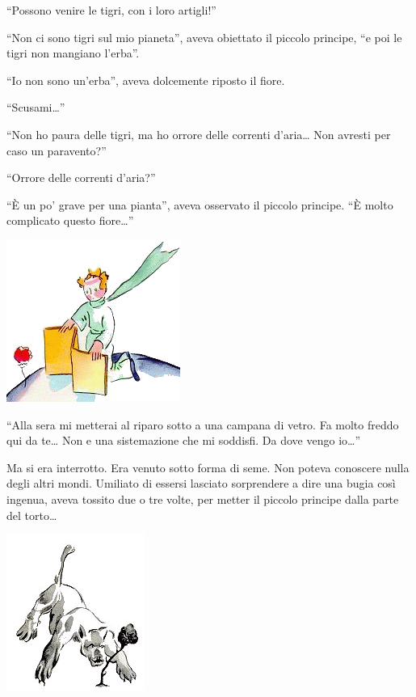 \documentclass[11pt]{scrbook}
\begin{document}
``Possono venire le tigri, con i loro artigli!''

``Non ci sono tigri sul mio pianeta'', aveva obiettato il piccolo
principe, ``e poi le tigri non mangiano l'erba''.

``Io non sono un'erba'', aveva dolcemente riposto il fiore.

``Scusami\ldots{}''

``Non ho paura delle tigri, ma ho orrore delle correnti d'aria\ldots{}
Non avresti per caso un paravento?''

``Orrore delle correnti d'aria?''

``È un po' grave per una pianta'', aveva osservato il piccolo principe.
``È molto complicato questo fiore\ldots{}''

\begin{center}
\includegraphics{./img/8c.png}
\end{center}

``Alla sera mi metterai al riparo sotto a una campana di vetro. Fa molto
freddo qui da te\ldots{} Non e una sistemazione che mi soddisfi. Da dove
vengo io\ldots{}''

Ma si era interrotto. Era venuto sotto forma di seme. Non poteva
conoscere nulla degli altri mondi. Umiliato di essersi lasciato
sorprendere a dire una bugia così ingenua, aveva tossito due o tre
volte, per metter il piccolo principe dalla parte del torto\ldots{}

\begin{center}
\includegraphics{./img/8d.png}
\end{center}
\end{document}

